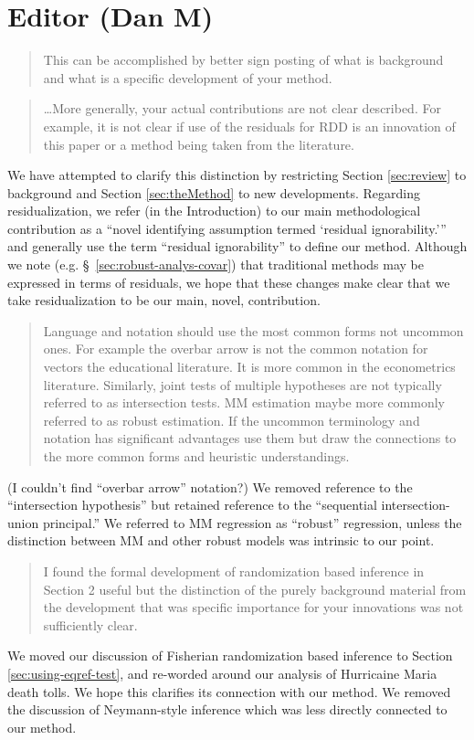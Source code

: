 \documentclass[12pt]{article}
\begin{document}
\section{Editor (Dan M)}

\begin{quote}
This can be accomplished by better sign posting of what
is background and what is a specific development of your
method.
\end{quote}
\begin{quote}
\dots More generally, your actual contributions
are not clear described. For example, it is not clear if use of the
residuals for RDD is an innovation of this paper or a method being
taken from the literature.
\end{quote}
We have attempted to clarify this distinction by restricting Section
\ref{sec:review} to background and Section \ref{sec:theMethod} to new
developments. Regarding residualization, we refer (in the
Introduction) to our main
methodological contribution as a ``novel identifying assumption termed
`residual ignorability.''' and generally use the term ``residual
ignorability'' to define our method.
Although we note (e.g. \S~\ref{sec:robust-analys-covar}) that
traditional methods may be expressed in terms of residuals, we hope
that these changes make clear that we take residualization to be our
main, novel, contribution.

\begin{quote}
Language and notation should use the most common forms not
uncommon ones. For example the overbar arrow is not the common
notation for vectors the educational literature. It is more common in
the econometrics literature. Similarly, joint tests of multiple
hypotheses are not typically referred to as intersection tests. MM
estimation maybe more commonly referred to as robust estimation. If
the uncommon terminology and notation has significant advantages use
them but draw the connections to the more common forms and heuristic
understandings.
\end{quote}
(I couldn't find ``overbar arrow'' notation?) We removed reference to
the ``intersection hypothesis'' but retained reference to the
``sequential intersection-union principal.'' We referred to MM
regression as ``robust'' regression, unless the distinction between MM
and other robust models was intrinsic to our point.

\begin{quote}
I found the formal development of randomization based inference in
Section 2 useful but the distinction of the purely background material
from the development that was specific importance for your innovations
was not sufficiently clear.
\end{quote}
We moved our discussion of Fisherian randomization based inference to
Section \ref{sec:using-eqref-test}, and re-worded around our
analysis of Hurricaine Maria death tolls. We hope this clarifies its
connection with our method. We removed the discussion of Neymann-style
inference which was less directly connected to our method.
\end{document}
